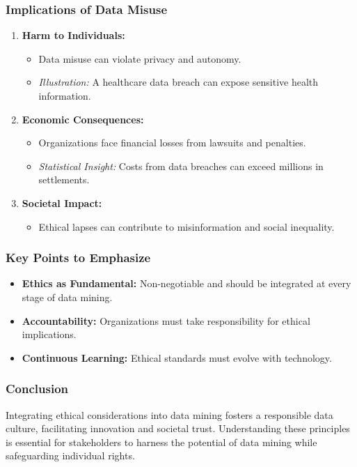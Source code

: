 \documentclass[aspectratio=169]{beamer}
\begin{document}
\begin{frame}[fragile]
    \frametitle{Implications of Data Misuse}
    \begin{enumerate}
        \item \textbf{Harm to Individuals:}
        \begin{itemize}
            \item Data misuse can violate privacy and autonomy.
            \item \textit{Illustration:} A healthcare data breach can expose sensitive health information.
        \end{itemize}

        \item \textbf{Economic Consequences:}
        \begin{itemize}
            \item Organizations face financial losses from lawsuits and penalties.
            \item \textit{Statistical Insight:} Costs from data breaches can exceed millions in settlements.
        \end{itemize}

        \item \textbf{Societal Impact:}
        \begin{itemize}
            \item Ethical lapses can contribute to misinformation and social inequality.
        \end{itemize}
    \end{enumerate}
\end{frame}

\begin{frame}[fragile]
    \frametitle{Key Points to Emphasize}
    \begin{itemize}
        \item \textbf{Ethics as Fundamental:} Non-negotiable and should be integrated at every stage of data mining.
        \item \textbf{Accountability:} Organizations must take responsibility for ethical implications.
        \item \textbf{Continuous Learning:} Ethical standards must evolve with technology.
    \end{itemize}
\end{frame}

\begin{frame}[fragile]
    \frametitle{Conclusion}
    Integrating ethical considerations into data mining fosters a responsible data culture, facilitating innovation and societal trust. Understanding these principles is essential for stakeholders to harness the potential of data mining while safeguarding individual rights.
\end{frame}
\end{document}
